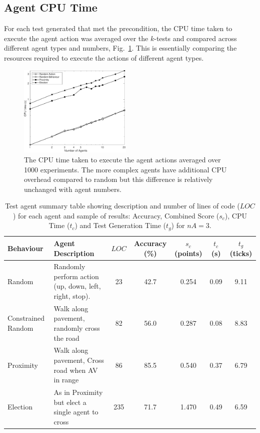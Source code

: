 \documentclass[letterpaper, 10 pt, journal, twoside]{IEEEtran}
\begin{document}
\subsection{Agent CPU Time}
For each test generated that met the precondition, the CPU time taken to execute the agent action was averaged over the $k$-tests and compared across different agent types and numbers, Fig.~\ref{CPUTime}. This is essentially comparing the resources required to execute the actions of different agent types.

\begin{figure}[!t]
	\centering
\includegraphics[width=0.48\textwidth]{TimeCPU_log.pdf}
	\caption{The CPU time taken to execute the agent actions averaged over 1000 experiments. The more complex agents have additional CPU overhead compared to random but this difference is relatively unchanged with agent numbers.}
	\label{CPUTime}
\end{figure}


\begin{table}
\centering
\caption{Test agent summary table showing description and number of lines of code ($LOC$) for each agent and sample of results: Accuracy, Combined Score ($s_c$), CPU Time ($t_{c}$) and Test Generation Time ($t_{g}$) for $nA=3$.}
\label{ResultsTable}
\begin{tabular}{|l|p{6.2cm}|c||c|c|c|c|}
\hline
\textbf{Behaviour} & \textbf{Agent Description} & $LOC$ & Accuracy (\%) & $s_c$ (points)&  $t_{c}$ (s) & $t_{g}$ (ticks) \\
\hline
Random & Randomly perform action (up, down, left, right, stop). 		&  23& 42.7 & 0.254 & 0.09 & 9.11 \\
Constrained Random & Walk along pavement, randomly cross the road 		&  82& 56.0 & 0.287 & 0.08 & 8.83 \\
Proximity & Walk along pavement, Cross road when AV in range 			&  86& 85.5 & 0.540 & 0.37 & 6.79 \\
Election & As in Proximity but elect a single agent to cross 			& 235& 71.7 & 1.470 & 0.49 & 6.59 \\
\hline 
\end{tabular}
\end{table}
\end{document}
